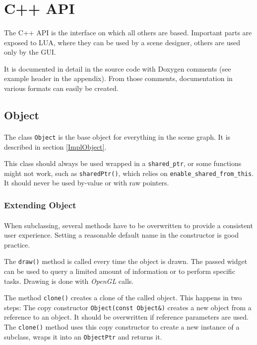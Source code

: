 \section{C++ API}
\paragraph{}
The C++ API is the interface on which all others are based.
Important parts are exposed to LUA, where they can be used by a scene designer, others are used only by the GUI.

It is documented in detail in the source code with Doxygen comments (see example header in the appendix).
From those comments, documentation in various formats can easily be created.

\subsection{Object\label{DocObject}}
\paragraph{}
The class \lstinline{Object} is the base object for everything in the scene graph.
It is described in section \ref{ImplObject}.

This class should always be used wrapped in a \lstinline{shared_ptr}, or some functions might not work, such as \lstinline{sharedPtr()}, which relies on \lstinline{enable_shared_from_this}.
It should never be used by-value or with raw pointers.


\subsubsection{Extending Object}
\paragraph{}
When subclassing, several methods have to be overwritten to provide a consistent user experience.
Setting a reasonable default name in the constructor is good practice.

The \lstinline{draw()} method is called every time the object is drawn.
The passed widget can be used to query a limited amount of information or to perform specific tasks.
Drawing is done with \textit{OpenGL} calls.

The method \lstinline{clone()} creates a clone of the called object.
This happens in two steps:
The copy constructor \lstinline{Object(const Object&)} creates a new object from a reference to an object.
It should be overwritten if reference parameters are used.
The \lstinline{clone()} method uses this copy constructor to create a new instance of a subclass, wraps it into an \lstinline{ObjectPtr} and returns it.


